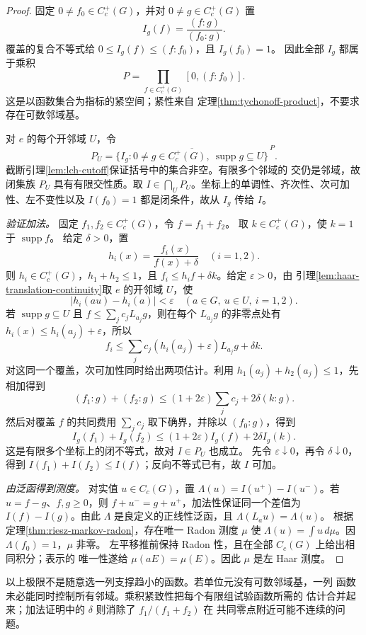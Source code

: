 \begin{proof}
固定 $0\ne f_0\in C_c^+(G)$，并对 $0\ne g\in C_c^+(G)$ 置
\[
 I_g(f)=\frac{(f:g)}{(f_0:g)}.
\]
覆盖的复合不等式给 $0\le I_g(f)\le(f:f_0)$，且 $I_g(f_0)=1$。
因此全部 $I_g$ 都属于乘积
\[
 P=\prod_{f\in C_c^+(G)}[0,(f:f_0)].
\]
这是以函数集合为指标的紧空间；紧性来自
定理\ref{thm:tychonoff-product}，不要求存在可数邻域基。

对 $e$ 的每个开邻域 $U$，令
\[
 P_U=\overline{\{I_g:0\ne g\in C_c^+(G),\
                 \operatorname{supp}g\subseteq U\}}^{\,P}.
\]
截断引理\ref{lem:lch-cutoff}保证括号中的集合非空。有限多个邻域的
交仍是邻域，故闭集族 $P_U$ 具有有限交性质。取
$I\in\bigcap_U P_U$。坐标上的单调性、齐次性、次可加性、左不变性以及
$I(f_0)=1$ 都是闭条件，故从 $I_g$ 传给 $I$。

\emph{验证加法。} 固定 $f_1,f_2\in C_c^+(G)$，令 $f=f_1+f_2$。
取 $k\in C_c^+(G)$，使 $k=1$ 于 $\operatorname{supp}f$。
给定 $\delta>0$，置
\[
 h_i(x)=\frac{f_i(x)}{f(x)+\delta}\quad(i=1,2).
\]
则 $h_i\in C_c^+(G)$，$h_1+h_2\le1$，且
$f_i\le h_if+\delta k$。给定 $\varepsilon>0$，由
引理\ref{lem:haar-translation-continuity}取 $e$ 的开邻域 $U$，使
\[
 |h_i(au)-h_i(a)|<\varepsilon
 \quad(a\in G,\ u\in U,\ i=1,2).
\]
若 $\operatorname{supp}g\subseteq U$ 且
$f\le\sum_jc_jL_{a_j}g$，则在每个 $L_{a_j}g$ 的非零点处有
$h_i(x)\le h_i(a_j)+\varepsilon$，所以
\[
 f_i\le\sum_jc_j(h_i(a_j)+\varepsilon)L_{a_j}g+\delta k.
\]
对这同一个覆盖，次可加性同时给出两项估计。利用
$h_1(a_j)+h_2(a_j)\le1$，先相加得到
\[
 (f_1:g)+(f_2:g)
 \le (1+2\varepsilon)\sum_jc_j+2\delta(k:g).
\]
然后对覆盖 $f$ 的共同费用 $\sum_jc_j$ 取下确界，并除以 $(f_0:g)$，得到
\[
 I_g(f_1)+I_g(f_2)
 \le(1+2\varepsilon)I_g(f)+2\delta I_g(k).
\]
这是有限多个坐标上的闭不等式，故对 $I\in P_U$ 也成立。
先令 $\varepsilon\downarrow0$，再令 $\delta\downarrow0$，得到
$I(f_1)+I(f_2)\le I(f)$；反向不等式已有，故 $I$ 可加。

\emph{由泛函得到测度。} 对实值 $u\in C_c(G)$，置
$\Lambda(u)=I(u^+)-I(u^-)$。若 $u=f-g$、$f,g\ge0$，则
$f+u^-=g+u^+$，加法性保证同一个差值为 $I(f)-I(g)$。由此
$\Lambda$ 是良定义的正线性泛函，且 $\Lambda(L_au)=\Lambda(u)$。
根据定理\ref{thm:riesz-markov-radon}，存在唯一 Radon 测度 $\mu$ 使
$\Lambda(u)=\int u\,d\mu$。因 $\Lambda(f_0)=1$，$\mu$ 非零。
左平移推前保持 Radon 性，且在全部 $C_c(G)$ 上给出相同积分；表示的
唯一性遂给 $\mu(aE)=\mu(E)$。因此 $\mu$ 是左 Haar 测度。
\end{proof}

以上极限不是随意选一列支撑趋小的函数。若单位元没有可数邻域基，一列
函数未必能同时控制所有邻域。乘积紧致性把每个有限组试验函数所需的
估计合并起来；加法证明中的 $\delta$ 则消除了 $f_1/(f_1+f_2)$ 在
共同零点附近可能不连续的问题。


